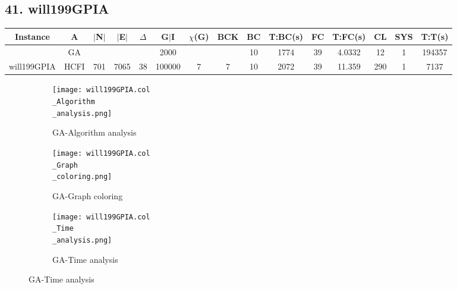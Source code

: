 \documentclass[10pt]{article}
\begin{document}
\subsection*{\hspace{0,9073976cm} 41. will199GPIA}
\begin{table}[H]
\centering
\begin{tabular}{|c|c|c|c|c|c|c|c|c|c|c|c|c|c|c|}
\hline
Instance& A &$|$N$|$ & $|$E$|$ & $\Delta$ & G$|$I & $\chi$(G) &BCK&BC & T:BC(s) & FC & T:FC(s) & CL & SYS & T:T(s) \\ \hline \hline

	&GA&       &                   &                     &    2000     &     \cellcolor{yellow} & {\cellcolor{yellow}}& {{\cellcolor{green}10}}
&1774   &39        & 4.0332                  &12                    &1          &194357        \\ \cline{2-2} \cline{6-6} \cline{9-15}
 \multirow{-2}{*}{will199GPIA} &HCFI   &\multirow{-2}{*}{701}   &\multirow{-2}{*}{7065}     &\multirow{-2}{*}{38}     &100000     &\multirow{-2}{*}{\cellcolor{yellow}7}      & \multirow{-2}{*}{\cellcolor{yellow}7}    &{\cellcolor{green}10}     & 2072        &39    &11.359         &290    &    1 &7137         \\ \hline
\end{tabular}
\end{table}
\graphicspath{{./Core1/Solutions/GA/will199GPIA.col}}
\begin{figure}[H]
\begin{subfigure}{.33\textwidth}
  \centering
  \texttt{[image: will199GPIA.col\\\_Algorithm\\\_analysis.png]}
  \caption{GA-Algorithm analysis}
   \label{fig:subfig1}
\end{subfigure}%
\begin{subfigure}{.33\textwidth}
  \centering
  \texttt{[image: will199GPIA.col\\\_Graph\\\_coloring.png]}
  \caption{GA-Graph coloring}
  \label{fig:subfig2}
\end{subfigure}
\begin{subfigure}{.33\textwidth}
  \centering
  \texttt{[image: will199GPIA.col\\\_Time\\\_analysis.png]}
  \caption{GA-Time analysis}
  \end{subfigure}
\end{figure}
\end{document}
